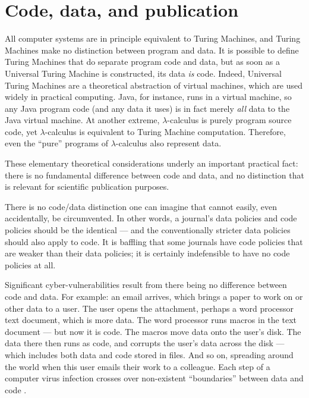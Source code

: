 \documentclass[10pt,a4paper]{article}
\begin{document}
\section{Code, data, and publication}
\label{supplement-on-code-data-publication}

All computer systems are in principle equivalent to Turing Machines, and Turing Machines make no distinction between program and data. It is possible to define Turing Machines that do separate program code and data, but as soon as a Universal Turing Machine is constructed, its data \emph{is\/} code. Indeed, Universal Turing Machines are a theoretical abstraction of virtual machines, which are used widely in practical computing. Java, for instance, runs in a virtual machine, so any Java program code (and any data it uses) is in fact merely \emph{all\/} data to the Java virtual machine. At another extreme, $\lambda$-calculus is purely program source code, yet $\lambda$-calculus is equivalent to Turing Machine computation. Therefore, even the ``pure'' programs of $\lambda$-calculus also represent data.

These elementary theoretical considerations underly an important practical fact: there is no fundamental difference between code and data, and no distinction that is relevant for scientific publication purposes. 

There is no code/data distinction one can imagine that cannot easily, even accidentally, be circumvented. In other words, a journal's data policies and code policies should be the identical --- and the conventionally stricter data policies should also apply to code. It is baffling that some journals have code policies that are weaker than their data policies; it is certainly indefensible to have no code policies at all.

Significant cyber-vulnerabilities result from there being no difference between code and data. For example: an email arrives, which brings a paper to work on or other data to a user. The user opens the attachment, perhaps a word processor text document, which is more data. The word processor runs macros in the text document --- but now it is code. The macros move data onto the user's disk. The data there then runs as code, and corrupts the user's data across the disk --- which includes both data and code stored in files. And so on, spreading around the world when this user emails their work to a colleague. Each step of a computer virus infection crosses over non-existent ``boundaries'' between data and code \cite{viruses}.
\end{document}
